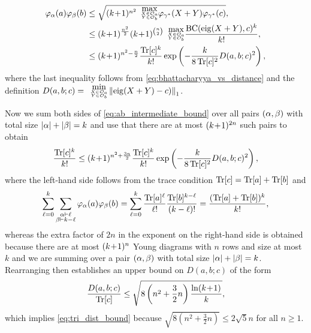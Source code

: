\documentclass[notitlepage, 11pt, letterpaper]{amsart}
\begin{document}
\begin{align}
    \label{eq:ab_intermediate_bound}
    \begin{split}
        \vp_{\ya}(\ea)\vp_{\yb}(\eb)
        &\leq \sqrt{\polyk{n^2}
        \tightdoublesubstack{\mathrm{max}}{X \in \orbit_{\ea}}{Y \in \orbit_{\eb}}
        \vp_{\yc^{*}}(X+Y)\vp_{\yc^{*}}(\ec)},\\
        &\leq \polyk{\frac{n^2}{2}}\polyk{\binom{n}{2}}
        \tightdoublesubstack{\mathrm{max}}{X \in \orbit_{\ea}}{Y \in \orbit_{\eb}}
        \frac{\BC(\eig(X+Y), c)^k}{k!}, \\
        &\leq \polyk{n^2-\frac{n}{2}} \frac{\tec^k}{k!}
        \exp\left(- \frac{k}{8 \tec^2} D(a,b;c)^2\right),
    \end{split}
\end{align}
where the last inequality follows from \cref{eq:bhattacharyya_vs_distance} and the definition $D(a,b;c) = \tightdoublesubstack{\mathrm{min}}{X \in \orbit_{\ea}}{Y \in \orbit_{\eb}}\norm{\eig(X+Y) - c)}_1$.

Now we sum both sides of \cref{eq:ab_intermediate_bound} over all pairs $(\alpha,\beta)$ with total size $|\alpha|+|\beta|=k$ and use that there are at most $(k\!+\!1)^{2n}$ such pairs to obtain
\begin{equation}
    \frac{\operatorname{Tr}[c]^k}{k!} \leq (k\!+\!1)^{n^2+\frac{3n}{2}} \frac{\operatorname{Tr}[c]^k}{k!}
        \exp\left(- \frac{k}{8 \operatorname{Tr}[c]^2} D(a,b;c)^2\right),
\end{equation}
where the left-hand side follows from the trace condition $\operatorname{Tr}[c]=\operatorname{Tr}[a]+\operatorname{Tr}[b]$ and
\begin{equation}
    \label{eq:binomial_trace}
    \sum_{\ell=0}^{k} \sum_{\substack{\alpha\vdash \ell\\\beta\vdash k-\ell}} \varphi_{\alpha}(a)\varphi_{\beta}(b) = \sum_{\ell=0}^{k} \frac{\operatorname{Tr}[a]^\ell}{\ell!} \frac{\operatorname{Tr}[b]^{k-\ell}}{(k-\ell)!} = \frac{(\operatorname{Tr}[a]+\operatorname{Tr}[b])^k}{k!},
\end{equation}
whereas the extra factor of $2n$ in the exponent on the right-hand side is obtained because there are at most $(k\!+\!1)^{n}$ Young diagrams with $n$ rows and size at most $k$ and we are summing over a pair $(\alpha,\beta)$ with total size $|\alpha|+|\beta|=k$.
Rearranging then establishes an upper bound on $D(a,b;c)$ of the form
\begin{equation}
    \frac{D(a,b;c)}{\operatorname{Tr}[c]} \leq \sqrt{8\left(n^2 + \frac{3}{2}n\right) \frac{\ln (k\!+\!1)^{}}{k}},
\end{equation}
which implies \cref{eq:tri_dist_bound} because $\sqrt{8\left(n^2 + \frac{3}{2}n\right)} \leq 2 \sqrt{5} n$ for all $n\geq 1$.
\end{document}
